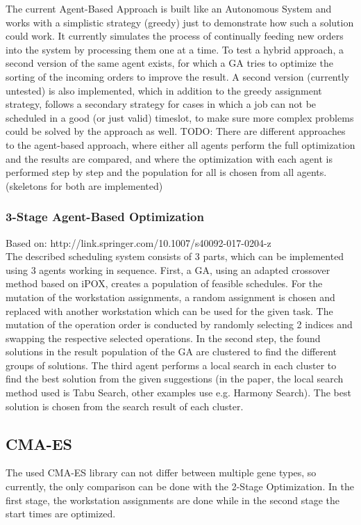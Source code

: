 \documentclass[a4paper,12pt,twoside]{scrreprt}
\begin{document}
\begin{flushleft}
The current Agent-Based Approach is built like an Autonomous System and works with a simplistic strategy (greedy) just to demonstrate how such a solution could work.
It currently simulates the process of continually feeding new orders into the system by processing them one at a time.
To test a hybrid approach, a second version of the same agent exists, for which a GA tries to optimize the sorting of the incoming orders to improve the result.
A second version (currently untested) is also implemented, which in addition to the greedy assignment strategy, follows a secondary strategy for cases in which a job can not be scheduled in a good (or just valid) timeslot, to make sure more complex problems could be solved by the approach as well.
\newline
\newline
TODO: 
There are different approaches to the agent-based approach, where either all agents perform the full optimization and the results are compared, and where the optimization with each agent is performed step by step and the population for all is chosen from all agents. (skeletons for both are implemented)



\subsubsection{3-Stage Agent-Based Optimization}
Based on: http://link.springer.com/10.1007/s40092-017-0204-z \\
The described scheduling system consists of 3 parts, which can be implemented using 3 agents working in sequence. First, a GA, using an adapted crossover method based on iPOX, creates a population of feasible schedules. For the mutation of the workstation assignments, a random assignment is chosen and replaced with another workstation which can be used for the given task. The mutation of the operation order is conducted by randomly selecting 2 indices and swapping the respective selected operations.
In the second step, the found solutions in the result population of the GA are clustered to find the different groups of solutions.
The third agent performs a local search in each cluster to find the best solution from the given suggestions (in the paper, the local search method used is Tabu Search, other examples use e.g. Harmony Search).
The best solution is chosen from the search result of each cluster.

\subsection{CMA-ES}
The used CMA-ES library can not differ between multiple gene types, so currently, the only comparison can be done with the 2-Stage Optimization. In the first stage, the workstation assignments are done while in the second stage the start times are optimized. 


\end{flushleft}
\end{document}
